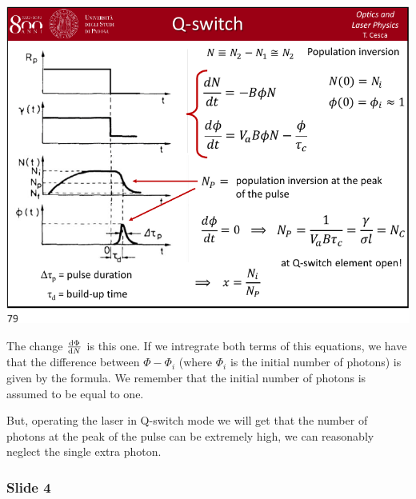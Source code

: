 \documentclass[../main/main.tex]{subfiles}
\begin{document}
\begin{minipage}[]{0.5\linewidth}
\centering
\includegraphics[page=3,width=1\textwidth]{../lessons/pdf_file/15_lecture.pdf}
\end{minipage}
\hspace{0.3cm}\vspace{0.3cm}
\begin{minipage}[c]{0.47\linewidth}

The change \( \dv{\Phi }{N}  \) is this one. If we intregrate both terms of this equations, we have that the difference between \( \Phi - \Phi _i \) (where \( \Phi _i \) is the initial number of photons) is given by the formula. We remember that the initial number of photons is assumed to be equal to one.

But, operating the laser in Q-switch mode we will get that the number of photons at the peak of the pulse can be extremely high, we can reasonably neglect the single extra photon.

\end{minipage}


\subsubsection*{Slide 4}
\end{document}
